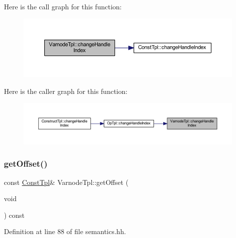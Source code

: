 Here is the call graph for this function\+:
\nopagebreak
\begin{figure}[H]
\begin{center}
\leavevmode
\includegraphics[width=350pt]{class_varnode_tpl_a2cd82b00a027189ff761b0d6db930ea6_cgraph}
\end{center}
\end{figure}
Here is the caller graph for this function\+:
\nopagebreak
\begin{figure}[H]
\begin{center}
\leavevmode
\includegraphics[width=350pt]{class_varnode_tpl_a2cd82b00a027189ff761b0d6db930ea6_icgraph}
\end{center}
\end{figure}
\mbox{\label{class_varnode_tpl_a451245a703d57112521947df5336574d}} 
\subsubsection{\texorpdfstring{getOffset()}{getOffset()}}
{\footnotesize\ttfamily const \mbox{\hyperlink{class_const_tpl}{Const\+Tpl}}\& Varnode\+Tpl\+::get\+Offset (\begin{DoxyParamCaption}\item[{void}]{ }\end{DoxyParamCaption}) const\hspace{0.3cm}{\ttfamily [inline]}}



Definition at line 88 of file semantics.\+hh.


